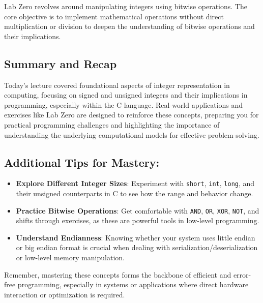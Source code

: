 \documentclass{article}
\begin{document}
Lab Zero revolves around manipulating integers using bitwise operations. The core objective is to implement mathematical operations without direct multiplication or division to deepen the understanding of bitwise operations and their implications.

\subsection{Summary and Recap}

Today's lecture covered foundational aspects of integer representation in computing, focusing on signed and unsigned integers and their implications in programming, especially within the C language. Real-world applications and exercises like Lab Zero are designed to reinforce these concepts, preparing you for practical programming challenges and highlighting the importance of understanding the underlying computational models for effective problem-solving.

\subsection{Additional Tips for Mastery:}

\begin{itemize}
    \item \textbf{Explore Different Integer Sizes}: Experiment with \texttt{short}, \texttt{int}, \texttt{long}, and their unsigned counterparts in C to see how the range and behavior change.
    
    \item \textbf{Practice Bitwise Operations}: Get comfortable with \texttt{AND}, \texttt{OR}, \texttt{XOR}, \texttt{NOT}, and shifts through exercises, as these are powerful tools in low-level programming.
    
    \item \textbf{Understand Endianness}: Knowing whether your system uses little endian or big endian format is crucial when dealing with serialization/deserialization or low-level memory manipulation.
\end{itemize}

Remember, mastering these concepts forms the backbone of efficient and error-free programming, especially in systems or applications where direct hardware interaction or optimization is required.
\end{document}
